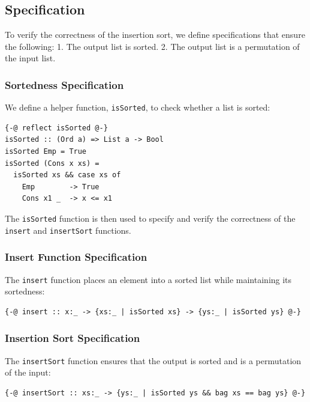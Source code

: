 \documentclass[]{rptuseminar}
\begin{document}
\subsection{Specification}

To verify the correctness of the insertion sort, we define specifications that ensure the following:
1. The output list is sorted.
2. The output list is a permutation of the input list.

\subsubsection{Sortedness Specification}

We define a helper function, \texttt{isSorted}, to check whether a list is sorted:

\begin{lstlisting}[caption=Sortedness Helper Function]
{-@ reflect isSorted @-}
isSorted :: (Ord a) => List a -> Bool
isSorted Emp = True
isSorted (Cons x xs) =
  isSorted xs && case xs of
    Emp        -> True
    Cons x1 _  -> x <= x1
\end{lstlisting}

The \texttt{isSorted} function is then used to specify and verify the correctness of the \texttt{insert} and \texttt{insertSort} functions.

\subsubsection{Insert Function Specification}

The \texttt{insert} function places an element into a sorted list while maintaining its sortedness:

\begin{lstlisting}[caption=Insert Specification]
{-@ insert :: x:_ -> {xs:_ | isSorted xs} -> {ys:_ | isSorted ys} @-}
\end{lstlisting}

\subsubsection{Insertion Sort Specification}

The \texttt{insertSort} function ensures that the output is sorted and is a permutation of the input:

\begin{lstlisting}[caption=Insertion Sort Specification]
{-@ insertSort :: xs:_ -> {ys:_ | isSorted ys && bag xs == bag ys} @-}
\end{lstlisting}
\end{document}
